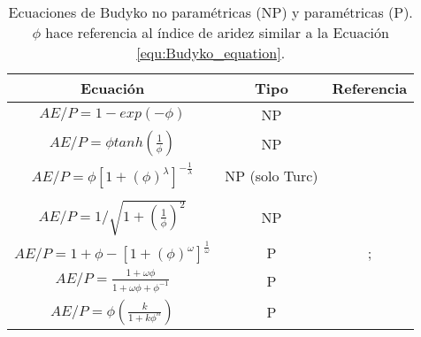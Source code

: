 \begin{table}[ht!]
\caption{Ecuaciones de Budyko no paramétricas (NP) y paramétricas (P). $\phi$ hace referencia al índice de aridez similar a la Ecuación \ref{equ:Budyko_equation}.}
\label{tab:BUDYKO_deterministic_equations}
\centering    
\begin{tabular}{ccc}
\hline
\textbf{Ecuación} & \textbf{Tipo} & \textbf{Referencia} \\ \hline
$AE/P = 1 - exp(-\phi) $  &      NP         &   \citet{schreiber1904relationship}                 \\
$AE/P = \phi tanh \left (  \frac{1}{\phi}  \right )$ &  NP              &    \citet{ol1911evaporation}                    \\
$AE/P = \phi \left [ 1 + (\phi)^{\lambda} \right ]^{-\frac{1}{\lambda}} $ &      NP (solo Turc) &    \citet[$\lambda$=2]{turc1954water} \\
 &      &  \citet{yang2008new} \\
$AE/P = 1 / \sqrt{1 + \left ( \frac{1}{\phi} \right )^{2}} $  &   NP           &      \citet{pike1964estimation}               \\
$AE/P = 1 + \phi -  \left [  1 + (\phi)^{\omega}\right ]^{\frac{1}{\omega}}$  &     P           &   \cite{Fu1981}; \citet{Zhang2004}                  \\
$AE/P = \frac{1 + \omega\phi}{1 + \omega\phi+\phi^{-1}} $  &   P             &      \citet{zhang2001response}             \\
$AE/P = \phi\left ( \frac{k}{1 + k \phi^{n}} \right ) $   &    P            &       \citet{zhou2015complementary}              \\ \hline
\end{tabular}
\end{table}